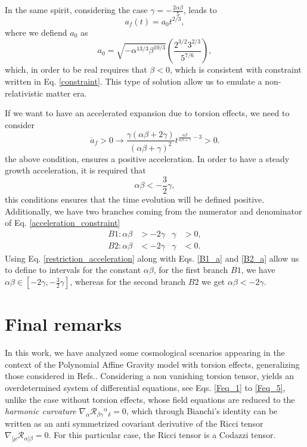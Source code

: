 In the same spirit, considering the case $\gamma = -\frac{2\alpha\beta}{5}$, leads to
\begin{equation}
    a_f(t) = a_{0}t^{2/3},
\end{equation}
where we defiend $a_0$ as 
\begin{equation}
    a_0 = \sqrt{-\alpha^{13/3}\beta^{10/3}}\left(\frac{2^{3/2}3^{2/3}}{5^{7/6}}\right),
\end{equation}    
which, in order to be real requires that $\beta <0$, which is consistent with constraint 
written in Eq. \eqref{constraint}. This type of solution allow us to emulate a non-relativistic 
matter era.

If we want to have an accelerated expansion due to torsion effects, we need to consider
\begin{equation}
    \label{acceleration_constraint}
    \ddot{a}_f > 0 \to \frac{\gamma\left(\alpha\beta + 2\gamma\right)}{\left(\alpha\beta + \gamma\right)^2}t^{\frac{\alpha\beta}{\alpha\beta + \gamma} - 3} > 0.
\end{equation}
the above condition, ensures a positive acceleration. In order to have a steady growth acceleration, it is required that 
\begin{equation}
    \label{restriction_acceleration}
    \alpha\beta < -\frac{3}{2}\gamma,
\end{equation}
this conditions ensures that the time evolution will be defined positive. Additionally, we have two branches coming from 
the numerator and denominator of Eq. \eqref{acceleration_constraint}
\begin{align}
    B1: \alpha\beta & > -2\gamma & \gamma & > 0, \label{B1_a} \\
    B2: \alpha\beta & < -2\gamma & \gamma & < 0. \label{B2_a}
\end{align}
Using Eq. \eqref{restriction_acceleration} along with Eqs. \eqref{B1_a} and \eqref{B2_a} allow us to define to intervals for the
constant $\alpha\beta$, for the first branch $B1$, we have $\alpha\beta \in \left[-2\gamma, -\frac{3}{2}\gamma\right]$, 
whereas for the second branch $B2$ we get $\alpha\beta <-2\gamma$. 

\section{Final remarks}
\label{sec:final_remarks}

In this work, we have analyzed some cosmological scenarios appearing in the context of the 
Polynomial Affine Gravity model with torsion effects, generalizing those considered in 
Refs.\cite{castillofelisola2019cosmological,Castillo_Felisola_2020}. Considering a non 
vanishing torsion tensor, yields an overdetermined system of differential equations, 
see Eqs. \eqref{Feq_1} to \eqref{Feq_5}, unlike the case without torsion effects, whose
field equations are reduced to the \textit{harmonic curvature} $\nabla_\alpha 
\mathcal{R}_{\beta\gamma}{}^{\alpha}{}_{\delta} = 0$, which through Bianchi's identity 
can be written as an anti symmetrized covariant derivative of the Ricci tensor $\nabla_{[\mu} 
\mathcal{R}_{\alpha]\beta} = 0$. For this particular case, the Ricci tensor is a
Codazzi tensor.

